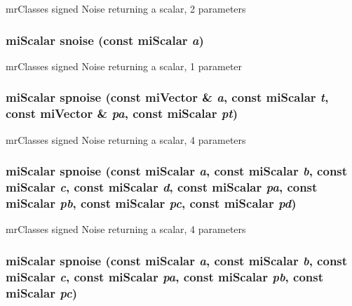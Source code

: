 mr\-Classes signed Noise returning a scalar, 2 parameters 

\subsubsection{\setlength{\rightskip}{0pt plus 5cm}mi\-Scalar snoise (const mi\-Scalar {\em a})\hspace{0.3cm}{\tt  [inline]}}\label{namespacersl_a56}


mr\-Classes signed Noise returning a scalar, 1 parameter 

\subsubsection{\setlength{\rightskip}{0pt plus 5cm}mi\-Scalar spnoise (const mi\-Vector \& {\em a}, const mi\-Scalar {\em t}, const mi\-Vector \& {\em pa}, const mi\-Scalar {\em pt})\hspace{0.3cm}{\tt  [inline]}}\label{namespacersl_a90}


mr\-Classes signed Noise returning a scalar, 4 parameters 

\subsubsection{\setlength{\rightskip}{0pt plus 5cm}mi\-Scalar spnoise (const mi\-Scalar {\em a}, const mi\-Scalar {\em b}, const mi\-Scalar {\em c}, const mi\-Scalar {\em d}, const mi\-Scalar {\em pa}, const mi\-Scalar {\em pb}, const mi\-Scalar {\em pc}, const mi\-Scalar {\em pd})\hspace{0.3cm}{\tt  [inline]}}\label{namespacersl_a89}


mr\-Classes signed Noise returning a scalar, 4 parameters 

\subsubsection{\setlength{\rightskip}{0pt plus 5cm}mi\-Scalar spnoise (const mi\-Scalar {\em a}, const mi\-Scalar {\em b}, const mi\-Scalar {\em c}, const mi\-Scalar {\em pa}, const mi\-Scalar {\em pb}, const mi\-Scalar {\em pc})\hspace{0.3cm}{\tt  [inline]}}\label{namespacersl_a88}


